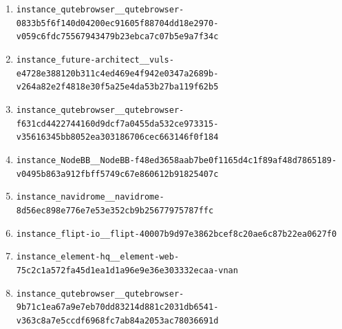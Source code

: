 \documentclass{llmxive}
\begin{document}
\begin{enumerate}
\item \texttt{instance\_qutebrowser\_\_qutebrowser-0833b5f6f140d04200ec91605f88704dd18e2970-v059c6fdc75567943479b23ebca7c07b5e9a7f34c}
\item \texttt{instance\_future-architect\_\_vuls-e4728e388120b311c4ed469e4f942e0347a2689b-v264a82e2f4818e30f5a25e4da53b27ba119f62b5}
\item \texttt{instance\_qutebrowser\_\_qutebrowser-f631cd4422744160d9dcf7a0455da532ce973315-v35616345bb8052ea303186706cec663146f0f184}
\item \texttt{instance\_NodeBB\_\_NodeBB-f48ed3658aab7be0f1165d4c1f89af48d7865189-v0495b863a912fbff5749c67e860612b91825407c}
\item \texttt{instance\_navidrome\_\_navidrome-8d56ec898e776e7e53e352cb9b25677975787ffc}
\item \texttt{instance\_flipt-io\_\_flipt-40007b9d97e3862bcef8c20ae6c87b22ea0627f0}
\item \texttt{instance\_element-hq\_\_element-web-75c2c1a572fa45d1ea1d1a96e9e36e303332ecaa-vnan}
\item \texttt{instance\_qutebrowser\_\_qutebrowser-9b71c1ea67a9e7eb70dd83214d881c2031db6541-v363c8a7e5ccdf6968fc7ab84a2053ac78036691d}
\end{enumerate}
\endgroup
\end{document}
